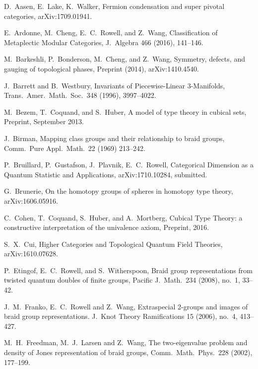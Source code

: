 \documentclass[12pt]{article}
\theoremstyle{definition}
\begin{document}
\begin{thebibliography}{0}

   D.\ Aasen, E.\ Lake, K.\ Walker, Fermion condensation and super pivotal categories, arXiv:1709.01941.
  
   E.\ Ardonne, M.\ Cheng, E.\ C.\ Rowell, and Z.\ Wang, {Classification of Metaplectic Modular Categories}, J.\ Algebra {466} (2016), 141--146.

   M.\ Barkeshli, P.\ Bonderson, M.\ Cheng, and Z.\ Wang, {Symmetry, defects, and gauging of topological phases}, Preprint (2014), arXiv:1410.4540.
  
   J.\ Barrett and B.\ Westbury, {Invariants
    of Piecewise-Linear 3-Manifolds}, Trans.\ Amer.\ Math.\ Soc.\ {348} (1996), 3997--4022.

   M.\ Bezem, T.\ Coquand, and S.\ Huber, A model of type theory in cubical sets, Preprint, September 2013.

   J.\ Birman, {Mapping class groups and their relationship to braid groups}, Comm.\ Pure Appl.\ Math.\ {22} (1969) 213--242.


     P.\ Bruillard, P.\ Gustafson, J.\ Plavnik, E.\ C.\ Rowell, Categorical Dimension as a Quantum Statistic and Applications, arXiv:1710.10284, submitted.
    
   G.\ Brunerie, On the homotopy groups of spheres in homotopy type theory, arXiv:1606.05916.
    
   C.\ Cohen, T.\ Coquand, S.\ Huber, and A.\ Mortberg, Cubical Type Theory: a constructive interpretation of the univalence axiom, Preprint, 2016.

   S.\ X.\ Cui, Higher Categories and Topological Quantum Field Theories, arXiv:1610.07628.
    
   P.\ Etingof, E.\ C.\ Rowell, and S.\ Witherspoon, {Braid group representations from twisted quantum doubles of finite groups}, Pacific J.\ Math.\ {234} (2008), no.\ 1, 33--42.

     J.\ M.\ Franko, E.\ C.\ Rowell and Z.\ Wang, {Extraspecial 2-groups and images of braid group representations.}  J.\ Knot Theory Ramifications {15} (2006),  no.\ 4, 413--427.
    
          M.\ H.\ Freedman, M.\ J.\ Larsen and Z.\ Wang, {The two-eigenvalue problem and density of Jones representation of braid groups}, Comm.\ Math.\ Phys.\ {228} (2002), 177--199.


\end{thebibliography}
\end{document}
